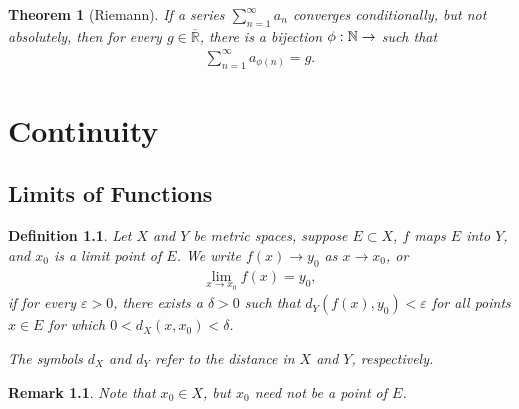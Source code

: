 \documentclass[11pt]{book}
\newtheorem{definition}{Definition}[chapter]
\newtheorem{theorem}{Theorem}[chapter]
\newtheorem{remark}{Remark}[chapter]
\theoremstyle{definition}
\numberwithin{equation}{chapter}
\begin{document}
\medskip

\begin{theorem}[Riemann]
If a series $\sum^\infty_{n=1} a_n$ converges conditionally, but not absolutely, then for every $g \in \overline{\mathbb{R}}$, there is a bijection $\phi: \mathbb{N} \to \markright{N}$ such that
\begin{align*}
    \sum^\infty_{n=1} a_{\phi(n)} = g.
\end{align*}
\end{theorem}




\chapter{Continuity}


\section{Limits of Functions}

\begin{definition}
Let $X$ and $Y$ be metric spaces, suppose $E \subset X$, $f$ maps $E$ into $Y$, and $x_0$ is a limit point of $E$. We write $f(x) \to y_0$ as $x \to x_0$, or
\begin{align*}
    \lim_{x \to x_0} f(x) = y_0,
\end{align*}
if for every $\varepsilon > 0$, there exists a $\delta > 0$ such that $d_Y(f(x), y_0) < \varepsilon$ for all points $x \in E$ for which $0 < d_X(x,x_0) < \delta$.

The symbols $d_X$ and $d_Y$ refer to the distance in $X$ and $Y$, respectively. 
\end{definition}

\begin{remark}
Note that $x_0 \in X$, but $x_0$ need not be a point of $E$. 
\end{remark}

\medskip
\end{document}
